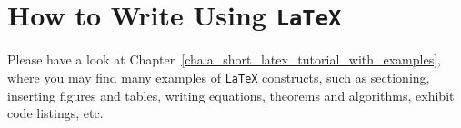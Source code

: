 	
\section{How to Write Using \texttt{LaTeX}} %
\label{sec:how_to_write_using_latex}

Please have a look at Chapter~\ref{cha:a_short_latex_tutorial_with_examples}, where you may find many examples of \href{http://tobi.oetiker.ch/lshort/lshort.pdf}{\texttt{LaTeX}} constructs, such as sectioning, inserting figures and tables, writing equations, theorems and algorithms, exhibit code listings, etc.

